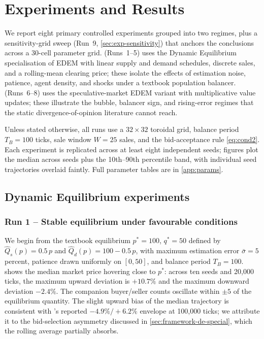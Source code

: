 \section{Experiments and Results}
\label{sec:experiments}

We report eight primary controlled experiments grouped into two
regimes, plus a sensitivity-grid sweep (Run~9,
\cref{sec:exp-sensitivity}) that anchors the conclusions across a
30-cell parameter grid.
 (Runs~1--5) uses the Dynamic Equilibrium
specialisation of EDEM with linear supply and demand schedules,
discrete sales, and a rolling-mean clearing price; these isolate the
effects of estimation noise, patience, agent density, and shocks
under a textbook population balancer. 
(Runs~6--8) uses the speculative-market EDEM variant with
multiplicative value updates; these illustrate the bubble, balancer
sign, and rising-error regimes that the static
divergence-of-opinion literature cannot reach.

Unless stated otherwise, all runs use a $32 \times 32$ toroidal grid,
balance period $T_{B} = 100$ ticks, sale window $W = 25$ sales, and
the bid-acceptance rule \cref{eq:cond2}. Each experiment is replicated
across at least eight independent seeds; figures plot the median across
seeds plus the 10th--90th percentile band, with individual seed
trajectories overlaid faintly. Full parameter tables are in
\cref{app:params}.

\subsection{Dynamic Equilibrium experiments}
\label{sec:experiments-de}

\subsubsection{Run 1 -- Stable equilibrium under favourable conditions}
\label{sec:exp-stable}

We begin from the textbook equilibrium $p^{*} = 100$, $q^{*} = 50$
defined by $\hat{Q}_{s}(p) = 0.5\,p$ and
$\hat{Q}_{d}(p) = 100 - 0.5\,p$, with maximum estimation error
$\bar{\sigma} = 5$ percent, patience drawn uniformly on $[0, 50]$,
and balance period $T_{B} = 100$.  shows the
median market price hovering close to $p^{*}$: across ten seeds and
20{,}000 ticks, the maximum upward deviation is $+10.7\%$ and the
maximum downward deviation $-2.4\%$. The companion buyer/seller
counts oscillate within $\pm 5$ of the equilibrium quantity. The
slight upward bias of the median trajectory is consistent with
\citet{arbuzov2018de}'s reported $-4.9\%/+6.2\%$ envelope at
100{,}000 ticks; we attribute it to the bid-selection asymmetry
discussed in \cref{sec:framework-de-special}, which the rolling
average partially absorbs.

